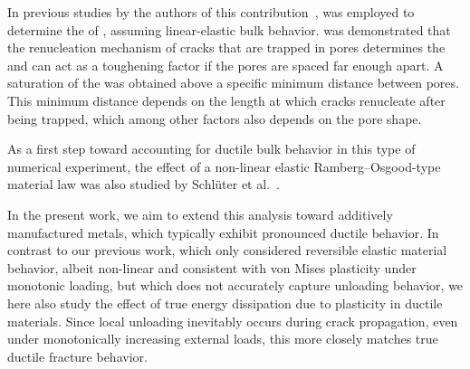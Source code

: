 \documentclass[pdflatex,sn-mathphys-num]{sn-jnl}%
\theoremstyle{thmstyleone}%
\theoremstyle{thmstyletwo}%
\theoremstyle{thmstylethree}%
\begin{document}
In previous studies by the authors of this contribution~\cite{schlueter_ermittlung_2025,schluter_determination_2025},
 was employed to determine the  of ,
assuming linear-elastic bulk behavior.  was demonstrated that
the renucleation mechanism of cracks that are trapped in pores
determines the 
and can act as a toughening factor if the pores are
spaced far enough apart. A saturation of the  was obtained above
a specific minimum distance between pores. This minimum distance depends on the
length at which cracks renucleate after being trapped, which among other factors also
depends on the pore shape.

As a first step toward accounting for ductile bulk behavior in this type of numerical experiment,
the effect of a non-linear elastic Ramberg--Osgood-type material law was also studied by Schlüter et al.~\cite{schluter_influence_2025}.

In the present work, we aim to extend this analysis
toward additively manufactured metals, which typically exhibit pronounced ductile behavior.
In contrast to our previous work, which only considered reversible elastic material behavior,
albeit non-linear and consistent with von Mises plasticity under monotonic loading,
but which does not accurately capture unloading behavior,
we here also study the effect of true energy dissipation due to plasticity in ductile materials.
Since local unloading inevitably occurs during crack propagation,
even under monotonically increasing external loads,
this more closely matches true ductile fracture behavior.
\end{document}

